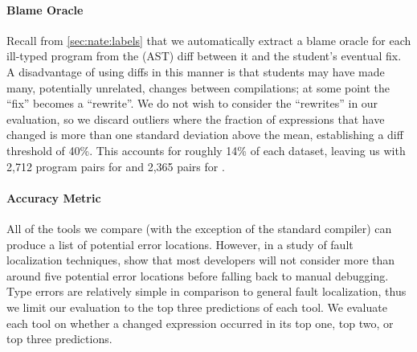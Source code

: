 \paragraph{Blame Oracle}
Recall from \autoref{sec:nate:labels} that we automatically extract a blame
oracle for each ill-typed program from the (AST) diff between it and the
student's eventual fix.
%
A disadvantage of using diffs in this manner is that students may have
made many, potentially unrelated, changes between compilations; at some
point the ``fix'' becomes a ``rewrite''.
%
We do not wish to consider the ``rewrites'' in our evaluation, so we
discard outliers where the fraction of expressions that have changed is
more than one standard deviation above the mean, establishing a diff
threshold of 40\%.
%
This accounts for roughly 14\% of each dataset, leaving us with
2,712 program pairs for \SPRING and 2,365 pairs for \FALL.



\paragraph{Accuracy Metric}
All of the tools we compare (with the exception of the standard \ocaml
compiler) can produce a list of potential error locations.
%
However, in a study of fault localization techniques,
\citet{Kochhar2016-oc} show that most developers will not consider more
than around five potential error locations before falling back to manual
debugging.
%
Type errors are relatively simple in comparison to general fault
localization, thus we limit our evaluation to the top three predictions
of each tool.
%
We evaluate each tool on whether a changed expression occurred in its
top one, top two, or top three predictions.









